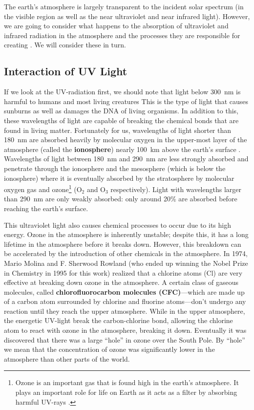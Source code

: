     The earth's atmosphere is largely transparent to the incident solar spectrum (in the visible region as well as the near ultraviolet and near infrared light). However, we are going to consider what happens to the absorption of ultraviolet and infrared radiation in the atmosphere and the processes they are responsible for creating \citep{schroeder1999introduction,thorndike1976energy}. We will consider these in turn.

    \subsection{Interaction of UV Light} %
    \label{sub:uv_light}
    
    If we look at the UV-radiation first, we should note that light below \SI{300}{\nm} is harmful to humans and most living creatures \citep{thorndike1976energy} This is the type of light that causes sunburns as well as damages the DNA of living organisms. In addition to this, these wavelengths of light are capable of breaking the chemical bonds that are found in living matter. Fortunately for us, wavelengths of light shorter than \SI{180}{\nm} are absorbed heavily by molecular oxygen in the upper-most layer of the atmosphere (called the \textbf{ionosphere}) nearly \SI{100}{km} above the earth's surface \citep{thorndike1976energy}. Wavelengths of light between \SI{180}{\nm} and \SI{290}{\nm} are less strongly absorbed and penetrate through the ionosphere and the mesosphere (which is below the ionosphere) where it is eventually absorbed by the stratosphere by molecular oxygen gas and ozone\footnote{
        Ozone is an important gas that is found high in the earth's atmosphere. It plays an important role for life on Earth as it acts as a filter by absorbing harmful UV-rays \citep{spiro2012chemistry}.
        }
    (O$_2$ and O$_3$ respectively). Light with wavelengths larger than \SI{290}{\nm} are only weakly absorbed: only around 20\% are absorbed before reaching the earth's surface.

    This ultraviolet light also causes chemical processes to occur due to its high energy. Ozone in the atmosphere is inherently unstable; despite this, it has a long lifetime in the atmosphere before it breaks down. However, this breakdown can be accelerated by the introduction of other chemicals in the atmosphere. In 1974, Mario Molina and F. Sherwood Rowland (who ended up winning the Nobel Prize in Chemistry in 1995 for this work) realized that a chlorine atoms (Cl) are very effective at breaking down ozone in the atmosphere. A certain class of gaseous molecules, called \textbf{chlorofluorocarbon molecules (CFC)}---which are made up of a carbon atom surrounded by chlorine and fluorine atoms---don't undergo any reaction until they reach the upper atmosphere. While in the upper atmosphere, the energetic UV-light break the carbon-chlorine bond, allowing the chlorine atom to react with ozone in the atmosphere, breaking it down. Eventually it was discovered that there was a large ``hole'' in ozone over the South Pole. By ``hole'' we mean that the concentration of ozone was significantly lower in the atmosphere than other parts of the world.

